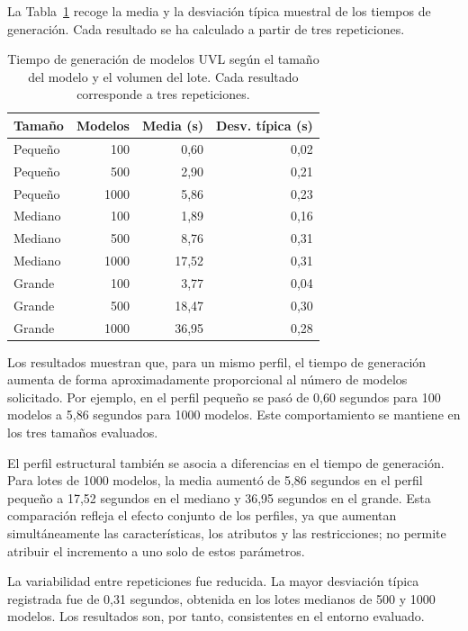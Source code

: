 La Tabla~\ref{tab:generacion-o4} recoge la media y la desviación típica
muestral de los tiempos de generación. Cada resultado se ha calculado a partir
de tres repeticiones.

\begin{table}[H]
\centering
\small
\renewcommand{\arraystretch}{1.2}
\begin{tabular}{lrrr}
\toprule
\textbf{Tamaño} & \textbf{Modelos} & \textbf{Media (s)} &
\textbf{Desv. típica (s)} \\
\midrule
Pequeño & 100  & 0,60 & 0,02 \\
Pequeño & 500  & 2,90 & 0,21 \\
Pequeño & 1000 & 5,86 & 0,23 \\
\midrule
Mediano & 100  & 1,89 & 0,16 \\
Mediano & 500  & 8,76 & 0,31 \\
Mediano & 1000 & 17,52 & 0,31 \\
\midrule
Grande & 100  & 3,77 & 0,04 \\
Grande & 500  & 18,47 & 0,30 \\
Grande & 1000 & 36,95 & 0,28 \\
\bottomrule
\end{tabular}
\caption{Tiempo de generación de modelos UVL según el tamaño del modelo y el
volumen del lote. Cada resultado corresponde a tres repeticiones.}
\label{tab:generacion-o4}
\end{table}

Los resultados muestran que, para un mismo perfil, el tiempo de generación
aumenta de forma aproximadamente proporcional al número de modelos solicitado.
Por ejemplo, en el perfil pequeño se pasó de 0,60 segundos para 100 modelos a
5,86 segundos para 1000 modelos. Este comportamiento se mantiene en los tres
tamaños evaluados.

El perfil estructural también se asocia a diferencias en el tiempo de
generación. Para lotes de 1000 modelos, la media aumentó de 5,86 segundos en el
perfil pequeño a 17,52 segundos en el mediano y 36,95 segundos en el grande.
Esta comparación refleja el efecto conjunto de los perfiles, ya que aumentan
simultáneamente las características, los atributos y las restricciones; no
permite atribuir el incremento a uno solo de estos parámetros.

La variabilidad entre repeticiones fue reducida. La mayor desviación típica
registrada fue de 0,31 segundos, obtenida en los lotes medianos de 500 y 1000
modelos. Los resultados son, por tanto, consistentes en el entorno evaluado.

